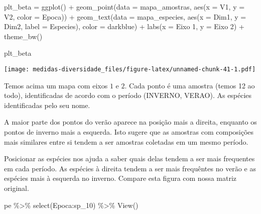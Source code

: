 \documentclass[
]{book}
\newenvironment{Shaded}{\begin{snugshade}}{\end{snugshade}}
\newcommand{\AttributeTok}[1]{\textcolor[rgb]{0.77,0.63,0.00}{#1}}
\newcommand{\FunctionTok}[1]{\textcolor[rgb]{0.00,0.00,0.00}{#1}}
\newcommand{\NormalTok}[1]{#1}
\newcommand{\OtherTok}[1]{\textcolor[rgb]{0.56,0.35,0.01}{#1}}
\newcommand{\SpecialCharTok}[1]{\textcolor[rgb]{0.00,0.00,0.00}{#1}}
\newcommand{\StringTok}[1]{\textcolor[rgb]{0.31,0.60,0.02}{#1}}
\begin{document}
\begin{Shaded}
\begin{Highlighting}[]
\NormalTok{plt\_beta }\OtherTok{=} \FunctionTok{ggplot}\NormalTok{() }\SpecialCharTok{+}
  \FunctionTok{geom\_point}\NormalTok{(}\AttributeTok{data =}\NormalTok{ mapa\_amostras,}
             \FunctionTok{aes}\NormalTok{(}\AttributeTok{x =}\NormalTok{ V1, }\AttributeTok{y =}\NormalTok{ V2, }\AttributeTok{color =}\NormalTok{ Epoca)) }\SpecialCharTok{+}
  \FunctionTok{geom\_text}\NormalTok{(}\AttributeTok{data =}\NormalTok{ mapa\_especies,}
             \FunctionTok{aes}\NormalTok{(}\AttributeTok{x =}\NormalTok{ Dim1, }\AttributeTok{y =}\NormalTok{ Dim2, }\AttributeTok{label =}\NormalTok{ Especies), }
            \AttributeTok{color =} \StringTok{\textquotesingle{}darkblue\textquotesingle{}}\NormalTok{) }\SpecialCharTok{+}
  \FunctionTok{labs}\NormalTok{(}\AttributeTok{x =} \StringTok{\textquotesingle{}Eixo 1\textquotesingle{}}\NormalTok{, }\AttributeTok{y =} \StringTok{\textquotesingle{}Eixo 2\textquotesingle{}}\NormalTok{) }\SpecialCharTok{+}
  \FunctionTok{theme\_bw}\NormalTok{()}

\NormalTok{plt\_beta}
\end{Highlighting}
\end{Shaded}

\texttt{[image: medidas-diversidade\_files/figure-latex/unnamed-chunk-41-1.pdf]}

Temos acima um mapa com eixos \(1\) e \(2\). Cada ponto é uma amostra (temos 12 ao todo), identificadas de acordo com o período (INVERNO, VERAO). As espécies identificadas pelo seu nome.

A maior parte dos pontos do verão aparece na posição mais a direita, enquanto os pontos de inverno mais a esquerda. Isto sugere que as amostras com composições mais similares entre si tendem a ser amostras coletadas em um mesmo período.

Posicionar as espécies nos ajuda a saber quais delas tendem a ser mais frequentes em cada período. As espécies à direita tendem a ser mais frequêntes no verão e as espécies mais à esquerda no inverno. Compare esta figura com nossa matriz original.

\begin{Shaded}
\begin{Highlighting}[]
\NormalTok{pe }\SpecialCharTok{\%\textgreater{}\%} 
  \FunctionTok{select}\NormalTok{(Epoca}\SpecialCharTok{:}\NormalTok{sp\_10) }\SpecialCharTok{\%\textgreater{}\%} 
  \FunctionTok{View}\NormalTok{()}
\end{Highlighting}
\end{Shaded}
\end{document}
